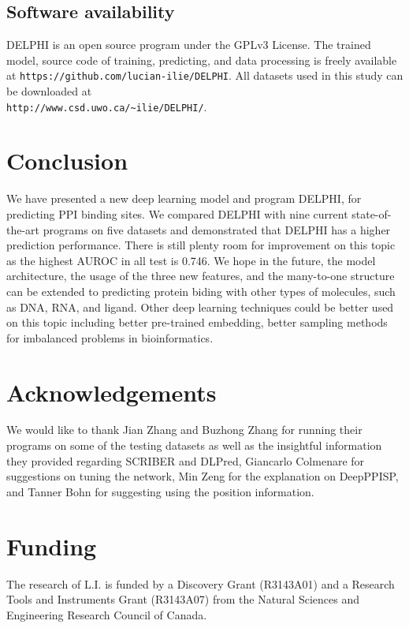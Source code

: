 \documentclass{bioinfo}
\begin{document}
\subsection{Software availability}
DELPHI is an open source program under the GPLv3 License. The trained model, source code of training, predicting, and data processing is freely available at \texttt{https://github.com/lucian-ilie/DELPHI}. 
All datasets used in this study can be downloaded at\\
\texttt{http://www.csd.uwo.ca/\~{}ilie/DELPHI/}.\\

\section{Conclusion}
We have presented a new deep learning model and program DELPHI, for predicting PPI binding sites. We compared DELPHI with nine current state-of-the-art programs on five datasets and demonstrated that DELPHI has a higher prediction performance. There is still plenty room for improvement on this topic as the highest AUROC in all test is 0.746. 
We hope in the future, the model architecture, the usage of the three new features, and the many-to-one structure can be extended to predicting protein biding with other types of molecules, such as DNA, RNA, and ligand. Other deep learning techniques could be better used on this topic including better pre-trained embedding, better sampling methods for imbalanced problems in bioinformatics. 

\section*{Acknowledgements}
We would like to thank Jian Zhang and Buzhong Zhang for running their programs on some of the testing datasets as well as the insightful information they provided regarding SCRIBER and DLPred, Giancarlo Colmenare for suggestions on tuning the network, Min Zeng for the explanation on DeepPPISP, and Tanner Bohn for suggesting using the position information.

\section*{Funding}
The research of L.I. is funded by a Discovery Grant (R3143A01) and a Research Tools and Instruments Grant (R3143A07) from the Natural Sciences and Engineering Research Council of Canada.



%

\end{document}
